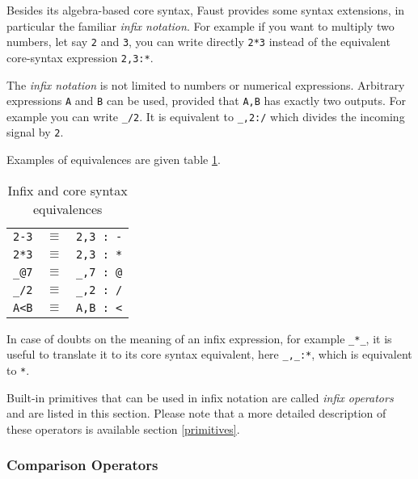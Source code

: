 Besides its algebra-based core syntax, Faust provides some syntax extensions, in particular the familiar \emph{infix notation}. For example if you want to multiply two numbers, let say \lstinline'2' and \lstinline'3', you can write directly \lstinline'2*3' instead of the equivalent core-syntax expression \lstinline'2,3:*'.

The \emph{infix notation} is not limited to numbers or numerical expressions. Arbitrary expressions \lstinline'A' and \lstinline'B' can be used, provided that \lstinline'A,B' has exactly two outputs. For example you can write \lstinline'_/2'. It is equivalent to \lstinline'_,2:/' which divides the incoming signal by \lstinline'2'. 

Examples of equivalences are given table \ref{tab-infixrules}.

\begin{table}[h]
	\begin{center}
	\begin{tabular}{|rcl|}
	\hline
	\lstinline'2-3' & $\equiv$ & \lstinline'2,3 : -'\\
	\lstinline'2*3' & $\equiv$ & \lstinline'2,3 : *'\\
	\lstinline'_@7' & $\equiv$ & \lstinline'_,7 : @'\\
	\lstinline'_/2' & $\equiv$ & \lstinline'_,2 : /'\\
	\lstinline'A<B' & $\equiv$ & \lstinline'A,B : <'\\
	\hline
	\end{tabular}
	\end{center}
	\caption{Infix and core syntax equivalences}
	\label{tab-infixrules}
\end{table}

In case of doubts on the meaning of an infix expression, for example \lstinline'_*_', it is useful to translate it to its core syntax equivalent, here \lstinline'_,_:*', which is equivalent to \lstinline'*'.
	
Built-in primitives that can be used in infix notation are called \emph{infix operators} and are listed in this section. Please note that a more detailed description of these operators is available section \ref{primitives}. 


\subsubsection{Comparison Operators}

